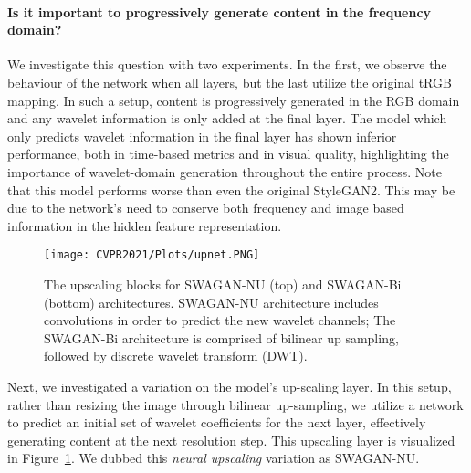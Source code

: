\documentclass[final]{CVPR2021/cvpr}
\begin{document}
\paragraph{\bf{Is it important to progressively generate content in the frequency domain?}}
We investigate this question with two experiments. In the first, we observe the behaviour of the network when all layers, but the last utilize the original tRGB mapping. In such a setup, content is progressively generated in the RGB domain and any wavelet information is only added at the final layer. The model which only predicts wavelet information in the final layer has shown inferior performance, both in time-based metrics and in visual quality, highlighting the importance of wavelet-domain generation throughout the entire process. Note that this model performs worse than even the original StyleGAN2. This may be due to the network's need to conserve both frequency and image based information in the hidden feature representation.

\begin{figure}[t]
\begin{center}
\texttt{[image: CVPR2021/Plots/upnet.PNG]}
\end{center}
   \caption{The upscaling blocks for SWAGAN-NU (top) and SWAGAN-Bi (bottom) architectures. SWAGAN-NU architecture includes  convolutions in order to predict the new wavelet channels; The SWAGAN-Bi architecture is comprised of bilinear up sampling, followed by discrete wavelet transform (DWT).}
\label{fig:UpNet}
\end{figure}

Next, we investigated a variation on the model's up-scaling layer. In this setup, rather than resizing the image through bilinear up-sampling, we utilize a network to predict an initial set of wavelet coefficients for the next layer, effectively generating content at the next resolution step. This upscaling layer is visualized in Figure~\ref{fig:UpNet}. We dubbed this \textit{neural upscaling} variation as SWAGAN-NU. 
\end{document}
